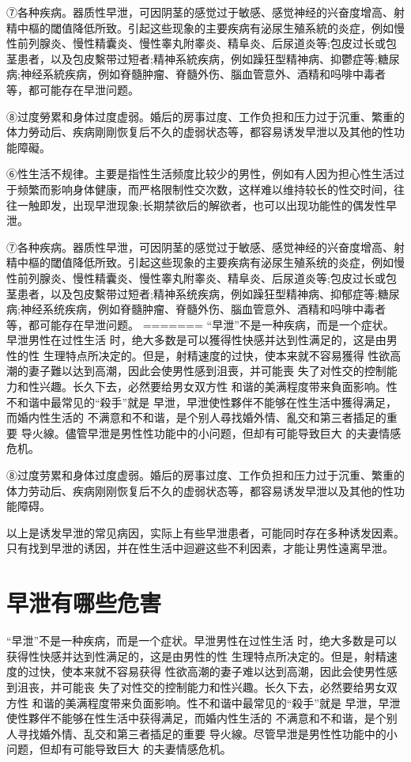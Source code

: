 \documentclass[12pt,UTF8]{ctexbook}
\begin{document}
⑦各种疾病。器质性早泄，可因阴茎的感觉过于敏感、感觉神经的兴奋度增高、射精中樞的閾值降低所致。引起这些现象的主要疾病有泌尿生殖系統的炎症，例如慢性前列腺炎、慢性精囊炎、慢性睾丸附睾炎、精阜炎、后尿道炎等;包皮过长或包茎患者，以及包皮繫带过短者;精神系統疾病，例如躁狂型精神病、抑鬱症等;糖尿病;神经系統疾病，例如脊髓肿瘤、脊髓外伤、腦血管意外、酒精和吗啡中毒者等，都可能存在早泄问题。

⑧过度勞累和身体过度虚弱。婚后的房事过度、工作负担和压力过于沉重、繁重的体力勞动后、疾病剛剛恢复后不久的虚弱状态等，都容易诱发早泄以及其他的性功能障礙。

⑥性生活不规律。主要是指性生活频度比较少的男性，例如有人因为担心性生活过于频繁而影响身体健康，而严格限制性交次数，这样难以维持较长的性交时间，往往一触即发，出现早泄现象;长期禁欲后的解欲者，也可以出现功能性的偶发性早泄。

⑦各种疾病。器质性早泄，可因阴茎的感觉过于敏感、感觉神经的兴奋度增高、射精中樞的閾值降低所致。引起这些现象的主要疾病有泌尿生殖系统的炎症，例如慢性前列腺炎、慢性精囊炎、慢性睾丸附睾炎、精阜炎、后尿道炎等;包皮过长或包茎患者，以及包皮繫带过短者;精神系统疾病，例如躁狂型精神病、抑郁症等;糖尿病;神经系统疾病，例如脊髓肿瘤、脊髓外伤、腦血管意外、酒精和吗啡中毒者等，都可能存在早泄问题。
=======
“早泄”不是一种疾病，而是一个症状。早泄男性在过性生活
时，绝大多数是可以獲得性快感并达到性满足的，这是由男性的性
生理特点所决定的。但是，射精速度的过快，使本来就不容易獲得
性欲高潮的妻子難以达到高潮，因此会使男性感到沮喪，并可能喪
失了对性交的控制能力和性兴趣。长久下去，必然要给男女双方性
和谐的美满程度带来負面影响。性不和谐中最常见的“殺手”就是
早泄，早泄使性夥伴不能够在性生活中獲得满足，而婚内性生活的
不满意和不和谐，是个别人尋找婚外情、亂交和第三者插足的重要
导火線。儘管早泄是男性性功能中的小问题，但却有可能导致巨大
的夫妻情感危机。

⑧过度劳累和身体过度虚弱。婚后的房事过度、工作负担和压力过于沉重、繁重的体力劳动后、疾病刚刚恢复后不久的虚弱状态等，都容易诱发早泄以及其他的性功能障碍。

以上是诱发早泄的常见病因，实际上有些早泄患者，可能同时存在多种诱发因素。只有找到早泄的诱因，并在性生活中迴避这些不利因素，才能让男性遠离早泄。

\section{早泄有哪些危害}

“早泄”不是一种疾病，而是一个症状。早泄男性在过性生活
时，绝大多数是可以获得性快感并达到性满足的，这是由男性的性
生理特点所决定的。但是，射精速度的过快，使本来就不容易获得
性欲高潮的妻子难以达到高潮，因此会使男性感到沮丧，并可能丧
失了对性交的控制能力和性兴趣。长久下去，必然要给男女双方性
和谐的美满程度带来负面影响。性不和谐中最常见的“殺手”就是
早泄，早泄使性夥伴不能够在性生活中获得满足，而婚内性生活的
不满意和不和谐，是个别人寻找婚外情、乱交和第三者插足的重要
导火線。尽管早泄是男性性功能中的小问题，但却有可能导致巨大
的夫妻情感危机。
\end{document}
